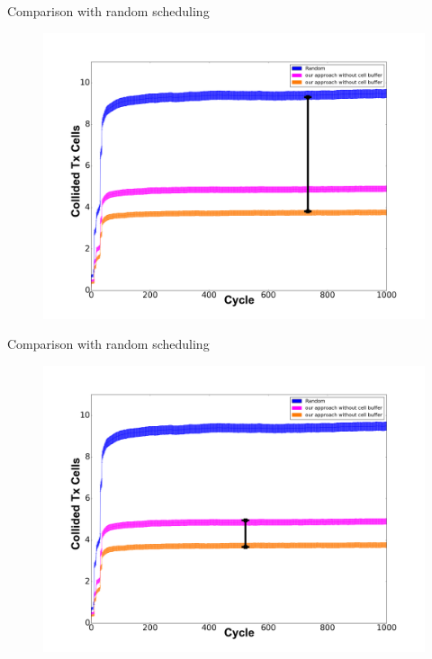 \begin{withoutheadline}

\begin{frame}{Comparison with random scheduling}

\begin{figure}[p]


\includegraphics[width=\linewidth]{figures/graph1-1.png}
\end{figure}



\end{frame}
\end{withoutheadline}

\begin{withoutheadline}

\begin{frame}{Comparison with random scheduling}

\begin{figure}[p]


\includegraphics[width=\linewidth]{figures/graph1-2.png}
\end{figure}



\end{frame}
\end{withoutheadline}


